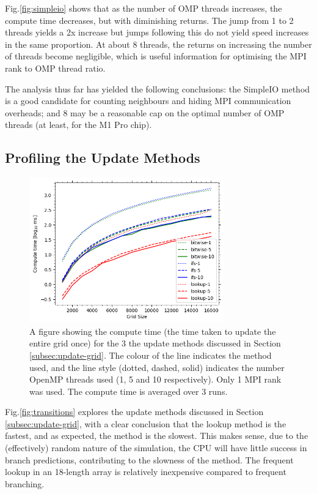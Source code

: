     Fig.\eqref{fig:simpleio} shows that as the number of OMP threads increases, the compute time decreases, but with
    diminishing returns.
    The jump from 1 to 2 threads yields a 2x increase but jumps following this do not yield speed increases in the same
    proportion.
    At about 8 threads, the returns on increasing the number of threads become negligible, which is useful information
    for optimising the MPI rank to OMP thread ratio.

    The analysis thus far has yielded the following conclusions: the SimpleIO method is a good candidate for counting
    neighbours and hiding MPI communication overheads; and 8 may be a reasonable cap on the optimal number of OMP threads
    (at least, for the M1 Pro chip).

    \subsection{Profiling the Update Methods}\label{subsec:prof-trans}
    \begin{figure}[htb]
    \centering
    \includegraphics[width=0.75\textwidth]{./figures/transitions}
    \caption{A figure showing the compute time (the time taken to update the entire grid once) for the 3 the update methods
        discussed in Section \eqref{subsec:update-grid}.
        The colour of the line indicates the method used, and the line style (dotted, dashed, solid) indicates the number
        OpenMP threads used (1, 5 and 10 respectively).
        Only 1 MPI rank was used.
        The compute time is averaged over 3 runs.}
    \label{fig:transitions}
    \end{figure}

    Fig.\eqref{fig:transitions} explores the update methods discussed in Section \eqref{subsec:update-grid}, with a
    clear conclusion that the lookup method is the fastest, and as expected, the  method is the slowest.
    This makes sense, due to the (effectively) random nature of the simulation, the CPU will have little success
    in branch predictions, contributing to the slowness of the  method.
    The frequent lookup in an 18-length array is relatively inexpensive compared to frequent branching.


